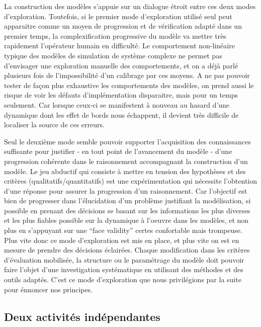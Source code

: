 La construction des modèles s'appuie sur un dialogue étroit entre ces deux modes d'exploration. Toutefois, si le premier mode d'exploration utilisé seul peut apparaitre comme un moyen de progression et de vérification adapté dans un premier temps, la complexification progressive du modèle va mettre très rapidement l'opérateur humain en difficulté. Le comportement non-linéaire typique des modèles de simulation de système complexe ne permet pas d'envisager une exploration manuelle des comportements, et on a déjà parlé plusieurs fois de l'impossibilité d'un calibrage par ces moyens. A ne pas pouvoir tester de façon plus exhaustive les comportements des modèles, on prend aussi le risque de voir les défauts d'implémentation disparaitre, mais pour un temps seulement. Car lorsque ceux-ci se manifestent à nouveau au hasard d'une dynamique dont les effet de bords nous échappent, il devient très difficile de localiser la source de ces erreurs. 

Seul le deuxième mode semble pouvoir supporter l'acquisition des connaissances suffisante pour justifier - en tout point de l'avancement du modèle - d'une progression cohérente dans le raisonnement accompagnant la construction d'un modèle. Le jeu abductif qui consiste à mettre en tension des hypothèses et des critères (qualitatifs/quantitatifs)  est une expérimentation qui nécessite l'obtention d'une réponse pour assurer la progression d'un raisonnement. Car l'objectif est bien de progresser dans l'élucidation d'un problème justifiant la modélisation, si possible en prenant des décisions se basant sur les informations les plus diverses et les plus fiables possible sur la dynamique à l'oeuvre dans les modèles, et non plus en s'appuyant sur une \foreignquote{english}{face validity} \autocite{Hermann1967} certes confortable mais trompeuse. Plus vite donc ce mode d'exploration est mis en place, et plus vite on est en mesure de prendre des décisions éclairées. Chaque modification dans les critères d'évaluation mobilisée, la structure ou le paramétrage du modèle doit pouvoir faire l'objet d'une investigation systématique en utilisant des méthodes et des outils adaptés. C'est ce mode d'exploration que nous privilégions par la suite pour énnoncer nos principes.

\subsection{Deux activités indépendantes}



